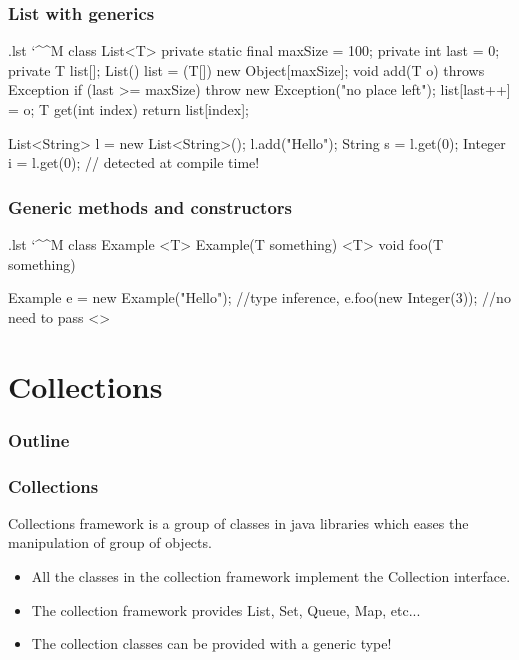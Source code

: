 \documentclass[10pt,handout]{beamer}
\makeatletter
\newenvironment{code}{%
  \begingroup
  \@bsphack
  \immediate\openout\lstvrb@out\jobname.lst
  \let\do\@makeother\dospecials\catcode`\^^M\active
  \def\verbatim@processline{%
    \immediate\write\lstvrb@out{\the\verbatim@line}}%
  \verbatim@start}{%
  \immediate\closeout\lstvrb@out
  \@esphack
  \endgroup
  
  \begin{alertblock}{}
    
  \end{alertblock}}
\makeatother
\begin{document}
\begin{frame}
\frametitle{List with generics}
\begin{code}
  class List<T> {
    private static final maxSize = 100;
    private int last = 0;
    private T list[];
    List() {
      list = (T[]) new Object[maxSize];
    }
    void add(T o) throws Exception{
      if (last >= maxSize) 
        throw new Exception("no place left");
      list[last++] = o;
    }
    T get(int index) {
      return list[index];
    }
  }

  List<String> l = new List<String>();
  l.add("Hello");
  String s = l.get(0);
  Integer i = l.get(0); // detected at compile time!
\end{code}
\end{frame}

\begin{frame}
\frametitle{Generic methods and constructors}
\begin{code}
class Example {
  <T> Example(T something) {}
  <T> void foo(T something) {}
}
  
  Example e = new Example("Hello"); //type inference, 
  e.foo(new Integer(3));            //no need to pass <>
\end{code}
\end{frame}

\section{Collections}
\begin{frame}
  \frametitle{Outline}
  \tableofcontents
\end{frame}

\begin{frame}
  \frametitle{Collections}
\begin{definition}
  Collections framework is a group of classes in java libraries which eases the manipulation of 
  group of objects.
\end{definition}
\begin{itemize}
  \item All the classes in the collection framework implement the Collection interface.
  \item The collection framework provides List, Set, Queue, Map, etc...
  \item The collection classes can be provided with a generic type!
\end{itemize}
\end{frame}
\end{document}
